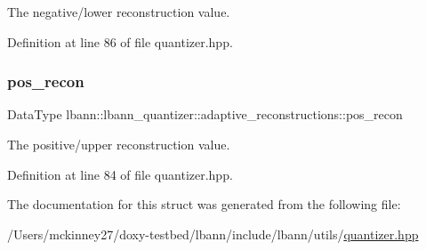 The negative/lower reconstruction value. 

Definition at line 86 of file quantizer.\+hpp.

\mbox{\label{structlbann_1_1lbann__quantizer_1_1adaptive__reconstructions_a9b3b4970e067920e056cdd54c2ad8e95}} 
\subsubsection{\texorpdfstring{pos\+\_\+recon}{pos\_recon}}
{\footnotesize\ttfamily Data\+Type lbann\+::lbann\+\_\+quantizer\+::adaptive\+\_\+reconstructions\+::pos\+\_\+recon}

The positive/upper reconstruction value. 

Definition at line 84 of file quantizer.\+hpp.



The documentation for this struct was generated from the following file\+:\begin{DoxyCompactItemize}
\item 
/\+Users/mckinney27/doxy-\/testbed/lbann/include/lbann/utils/\hyperlink{quantizer_8hpp}{quantizer.\+hpp}\end{DoxyCompactItemize}

